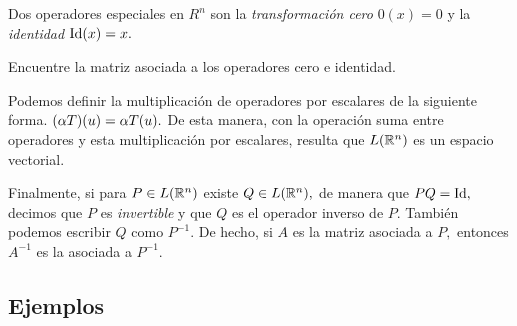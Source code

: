Dos operadores especiales en $R^{n}$ son la \emph{transformaci\'on cero} $0(x)=0$ y la \emph{identidad} $\operatorname{Id}(x)=x.$
\begin{problema}[\dag]
 Encuentre la matriz asociada a los operadores cero e identidad. 
\end{problema}

Podemos definir la multiplicaci\'on de operadores por escalares de la siguiente forma. $(\alpha T)(u)=\alpha T(u).$ De esta
manera, con la operaci\'on suma entre operadores y esta multiplicaci\'on por escalares, resulta que $L(\mathbb{R}^{n})$ es un
espacio vectorial.

Finalmente, si para $P\in L(\mathbb{R}^{n})$ existe $Q\in L(\mathbb{R}^{n}),$ de manera que $PQ=\operatorname{Id},$ decimos que $P$ es
\emph{invertible} y que $Q$ es el operador inverso de $P.$ Tambi\'en podemos escribir $Q$ como $P^{-1}.$
De hecho, si $A$ es la matriz asociada a $P,$ entonces $A^{-1}$ es la asociada a $P^{-1}.$




\subsection*{Ejemplos}


